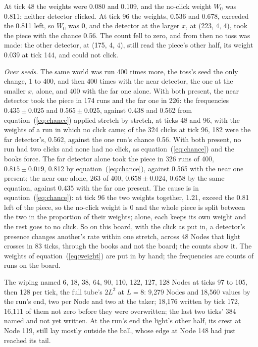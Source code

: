 \documentclass[pdflatex,sn-mathphys-num]{sn-jnl}
\begin{document}
At tick 48 the weights were 0.080 and 0.109, and the no-click weight $W_0$ was 0.811; neither detector clicked. At tick 96 the weights, 0.536 and 0.678, exceeded the 0.811 left, so $W_0$ was 0, and the detector at the larger $x$, at (223, 4, 4), took the piece with the chance 0.56. The count fell to zero, and from then no toss was made: the other detector, at (175, 4, 4), still read the piece's other half, its weight 0.039 at tick 144, and could not click.

\textit{Over seeds.} The same world was run 400 times more, the toss's seed the only change, 1 to 400, and then 400 times with the near detector, the one at the smaller $x$, alone, and 400 with the far one alone. With both present, the near detector took the piece in 174 runs and the far one in 226: the frequencies $0.435 \pm 0.025$ and $0.565 \pm 0.025$, against 0.438 and 0.562 from equation~(\ref{eq:chance}) applied stretch by stretch, at ticks 48 and 96, with the weights of a run in which no click came; of the 324 clicks at tick 96, 182 were the far detector's, 0.562, against the one run's chance 0.56. With both present, no run had two clicks and none had no click, as equation~(\ref{eq:chance}) and the books force. The far detector alone took the piece in 326 runs of 400, $0.815 \pm 0.019$, 0.812 by equation~(\ref{eq:chance}), against 0.565 with the near one present; the near one alone, 263 of 400, $0.658 \pm 0.024$, 0.658 by the same equation, against 0.435 with the far one present. The cause is in equation~(\ref{eq:chance}): at tick 96 the two weights together, 1.21, exceed the 0.81 left of the piece, so the no-click weight is 0 and the whole piece is split between the two in the proportion of their weights; alone, each keeps its own weight and the rest goes to no click. So on this board, with the click as put in, a detector's presence changes another's rate within one stretch, across 48 Nodes that light crosses in 83 ticks, through the books and not the board; the counts show it. The weights of equation~(\ref{eq:weight}) are put in by hand; the frequencies are counts of runs on the board.

The wiping named 6, 18, 38, 64, 90, 110, 122, 127, 128 Nodes at ticks 97 to 105, then 128 per tick, the full tube's $2L^2$ at $L = 8$: 9,279 Nodes and 18,560 values by the run's end, two per Node and two at the taker; 18,176 written by tick 172, 16,111 of them not zero before they were overwritten; the last two ticks' 384 named and not yet written. At the run's end the light's other half, its crest at Node 119, still lay mostly outside the ball, whose edge at Node 148 had just reached its tail.
\end{document}
